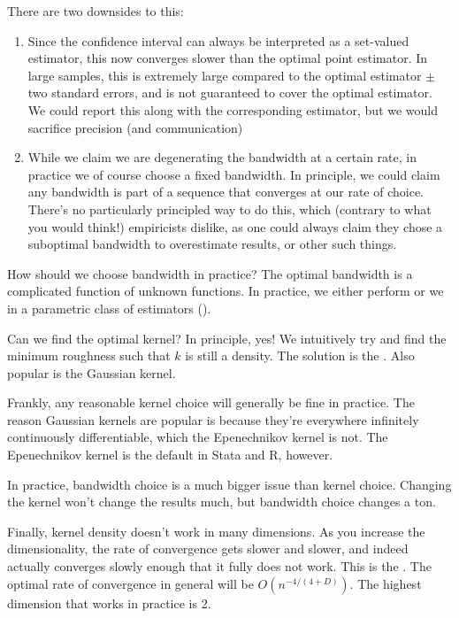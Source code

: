 \documentclass[10pt]{article}
\begin{document}
\begin{remark}
	There are two downsides to this:
	\begin{enumerate}
		\item Since the confidence interval can always be interpreted as a set-valued estimator, this now converges slower than the optimal point estimator. In large samples, this is extremely large compared to the optimal estimator $\pm$ two standard errors, and is not guaranteed to cover the optimal estimator. We could report this along with the corresponding estimator, but we would sacrifice precision (and communication)
		\item While we claim we are degenerating the bandwidth at a certain rate, in practice we of course choose a fixed bandwidth. In principle, we could claim any bandwidth is part of a sequence that converges at our rate of choice. There's no particularly principled way to do this, which (contrary to what you would think!) empiricists dislike, as one could always claim they chose a suboptimal bandwidth to overestimate results, or other such things.
	\end{enumerate}
\end{remark}

\begin{question}
	How should we choose bandwidth in practice? The optimal bandwidth is a complicated function of unknown functions. In practice, we either perform  or we  in a parametric class of estimators (\eg {}).
\end{question}

\begin{question}
	Can we find the optimal kernel? In principle, yes! We intuitively try and find the minimum roughness such that $k$ is still a density. The solution is the . Also popular is the Gaussian kernel. 
\end{question}

\begin{remark}
	Frankly, any reasonable kernel choice will generally be fine in practice. The reason Gaussian kernels are popular is because they're everywhere infinitely continuously differentiable, which the Epenechnikov kernel is not. The Epenechnikov kernel is the default in Stata and R, however. 
\end{remark}
In practice, bandwidth choice is a much bigger issue than kernel choice. Changing the kernel won't change the results much, but bandwidth choice changes a ton.

\begin{remark}
	Finally, kernel density doesn't work in many dimensions. As you increase the dimensionality, the rate of convergence gets slower and slower, and indeed actually converges slowly enough that it fully does not work. This is the . The optimal rate of convergence in general will be $O(n^{-4 / (4+D)})$. The highest dimension that works in practice is 2.
\end{remark}
\end{document}
